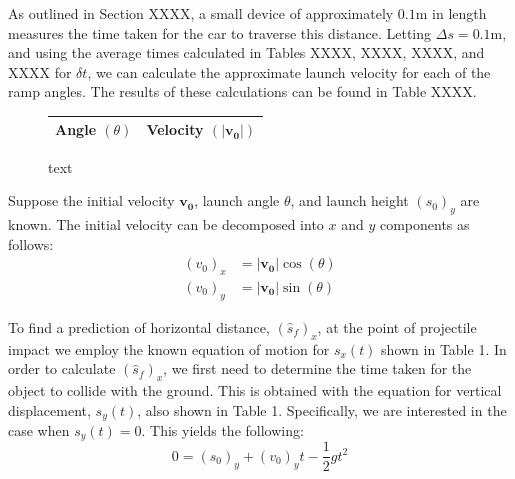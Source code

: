 \documentclass[a4paper]{article}
\begin{document}
As outlined in Section XXXX, a small device of approximately $0.1\si{\meter}$ in length measures the time taken for the car to traverse this distance. Letting $\Delta s = 0.1\si{\meter}$, and using the average times calculated in Tables XXXX, XXXX, XXXX, and XXXX for $\delta t$, we can calculate the approximate launch velocity for each of the ramp angles. The results of these calculations can be found in Table XXXX.
\begin{figure}[h]
	\begin{minipage}{0.45\textwidth}
		\centering
		\begin{tabular}{ll}
			\toprule
			Angle $(\theta)$ & Velocity $(|\boldsymbol{v_0}|)$\\
			\midrule
			\bottomrule
		\end{tabular}
	\end{minipage}
	\begin{minipage}{0.45\textwidth}
		\centering
		\caption{text}
	\end{minipage}
\end{figure}

Suppose the initial velocity $\boldsymbol{v_0}$, launch angle $\theta$, and launch height $(s_0)_y$ are known. The initial velocity can be decomposed into $x$ and $y$ components as follows:
\begin{align}
(v_0)_x &= |\boldsymbol{v_0}|\cos(\theta)\\
(v_0)_y &= |\boldsymbol{v_0}|\sin(\theta)
\end{align}

To find a prediction of horizontal distance, $(\hat{s}_f)_x$, at the point of projectile impact we employ the known equation of motion for $s_x(t)$ shown in Table 1. In order to calculate $(\hat{s}_f)_x$, we first need to determine the time taken for the object to collide with the ground. This is obtained with the equation for vertical displacement, $s_y(t)$, also shown in Table 1. Specifically, we are interested in the case when $s_y(t) = 0$. This yields the following:
\begin{equation}
0 = (s_0)_y + (v_0)_y t - \frac{1}{2}gt^2
\end{equation}
\end{document}
